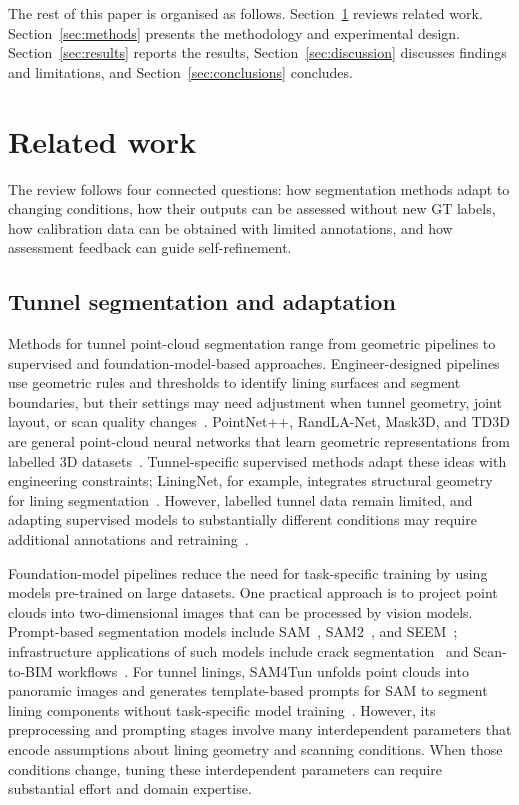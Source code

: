 \documentclass[a4paper,fleqn]{cas-dc}
\begin{document}
The rest of this paper is organised as follows. Section~\ref{sec:related} reviews related work. Section~\ref{sec:methods} presents the methodology and experimental design. Section~\ref{sec:results} reports the results, Section~\ref{sec:discussion} discusses findings and limitations, and Section~\ref{sec:conclusions} concludes.




\section{Related work}
\label{sec:related}

The review follows four connected questions: how segmentation methods adapt to changing conditions, how their outputs can be assessed without new GT labels, how calibration data can be obtained with limited annotations, and how assessment feedback can guide self-refinement.

\subsection{Tunnel segmentation and adaptation}

Methods for tunnel point-cloud segmentation range from geometric pipelines to supervised and foundation-model-based approaches. Engineer-designed pipelines use geometric rules and thresholds to identify lining surfaces and segment boundaries, but their settings may need adjustment when tunnel geometry, joint layout, or scan quality changes~\cite{huang2021bim,weidner2024generalized,wang2025automated}. PointNet++, RandLA-Net, Mask3D, and TD3D are general point-cloud neural networks that learn geometric representations from labelled 3D datasets~\cite{qi2017pointnet,hu2020randla,schult2023mask3d,kolodiazhnyi2024td3d}. Tunnel-specific supervised methods adapt these ideas with engineering constraints; LiningNet, for example, integrates structural geometry for lining segmentation~\cite{lin2025liningnet}. However, labelled tunnel data remain limited, and adapting supervised models to substantially different conditions may require additional annotations and retraining~\cite{su2024review, cha2024deep}.

Foundation-model pipelines reduce the need for task-specific training by using models pre-trained on large datasets. One practical approach is to project point clouds into two-dimensional images that can be processed by vision models. Prompt-based segmentation models include SAM~\cite{kirillov2023sam}, SAM2~\cite{ravi2024sam2}, and SEEM~\cite{zou2023segment}; infrastructure applications of such models include crack segmentation~\cite{ge2024cracksam,ye2024sam} and Scan-to-BIM workflows~\cite{wang2024omni,pan2024zero,ye2026maintenance}. For tunnel linings, SAM4Tun unfolds point clouds into panoramic images and generates template-based prompts for SAM to segment lining components without task-specific model training~\cite{ye2025sam4tun}. However, its preprocessing and prompting stages involve many interdependent parameters that encode assumptions about lining geometry and scanning conditions. When those conditions change, tuning these interdependent parameters can require substantial effort and domain expertise.
\end{document}
